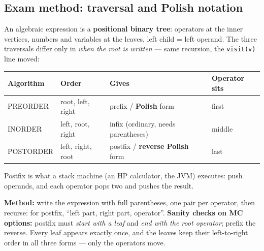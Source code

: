 \documentclass{fkt-notes}
\theoremstyle{definition}
\begin{document}
\subsection{Exam method: traversal and Polish notation}
%
An algebraic expression is a \textbf{positional binary tree}: operators
at the inner vertices, numbers and variables at the leaves, left child =
left operand. The three traversals differ only in \emph{when the root is
  written} --- same recursion, the \texttt{visit(v)} line moved:
\begin{rulepar}
  \begin{center}
    \renewcommand{\arraystretch}{1.3}
    \begin{tabular}{@{}llll@{}}
      \toprule
      Algorithm & Order             & Gives                                  & Operator sits \\
      \midrule
      PREORDER  & root, left, right & prefix / \textbf{Polish} form          & first         \\
      INORDER   & left, root, right & infix (ordinary, needs parentheses)    & middle        \\
      POSTORDER & left, right, root & postfix / \textbf{reverse Polish} form & last          \\
      \bottomrule
    \end{tabular}
  \end{center}
\end{rulepar}
Postfix is what a stack machine (an HP calculator, the JVM) executes:
push operands, and each operator pops two and pushes the result.

\textbf{Method:} write the expression with full parentheses, one pair per
operator, then recurse: for postfix, ``left part, right part, operator''.
\textbf{Sanity checks on MC options:} postfix must \emph{start with a leaf}
and \emph{end with the root operator}; prefix the reverse. Every leaf
appears exactly once, and the leaves keep their left-to-right order in
all three forms --- only the operators move.
\end{document}
